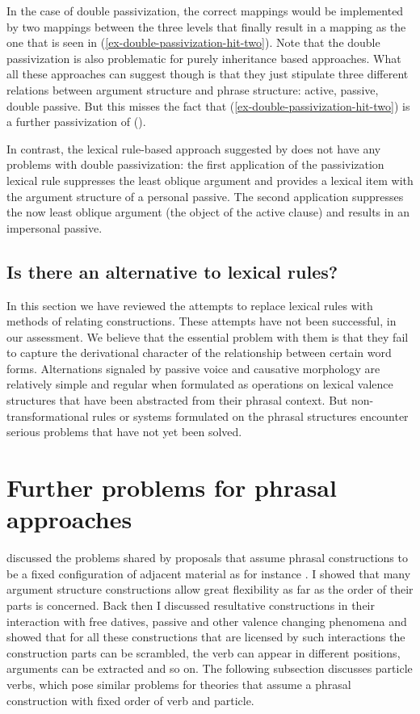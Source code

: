 \begin{exe}
\begin{xlist}[iv.]
\begin{exe}
\begin{xlist}[iv.]
\noindent
In the case of double passivization, the correct mappings would be implemented by two mappings between the three levels
that finally result in a mapping as the one that is seen in (\ref{ex-double-passivization-hit-two}).  
Note that the double passivization is also problematic for purely inheritance based approaches. What
all these approaches can suggest though is that they just stipulate three different relations between
argument structure and phrase structure: active, passive, double passive. But this misses the fact
that (\ref{ex-double-passivization-hit-two}) is a further passivization of ().

In contrast, the lexical rule-based approach suggested by
\citet{Mueller2003e} does not have any problems with double passivization:
the first application of the passivization lexical rule suppresses the least oblique argument and
provides a lexical item with the argument structure of a personal passive. The second application
suppresses the now least oblique argument (the object of the active clause) and results in an
impersonal passive.




\subsection{Is there an alternative to lexical rules?}
 
In this section we have reviewed the attempts to replace lexical rules with methods of relating
constructions.  These attempts have not been successful, in our assessment.  We believe that the
essential problem with them is that they fail to capture the derivational character of the
relationship between certain word forms.  Alternations signaled by passive voice and causative
morphology are relatively simple and regular when formulated as operations on lexical valence
structures that have been abstracted from their phrasal context.  But non-transformational rules or
systems formulated on the phrasal structures encounter serious problems that have not yet been
solved.

\section{Further problems for phrasal approaches}

\citet{Mueller2006d} discussed the problems shared by proposals that assume phrasal constructions to
be a fixed configuration of adjacent material as for instance \citep{GJ2004a}. I showed that many
argument structure constructions allow great flexibility as far as the order of their parts is
concerned. Back then I discussed resultative constructions in their interaction with free datives,
passive and other valence changing phenomena and showed that for all these constructions that are
licensed by such interactions the construction parts can be scrambled, the verb can appear in different positions,
arguments can be extracted and so on. The following subsection discusses particle verbs, which pose
similar problems for theories that assume a phrasal construction with fixed order of verb and particle.


\end{xlist}
\end{exe}
\end{xlist}
\end{exe}
